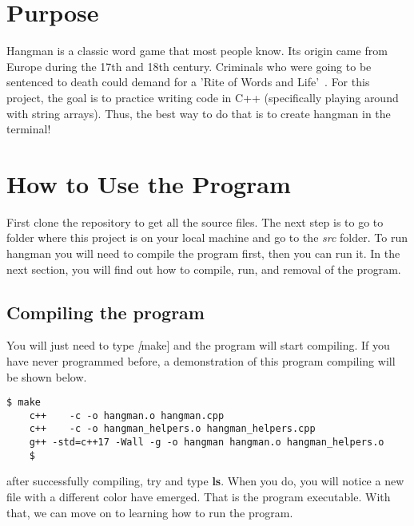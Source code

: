 \documentclass{article}
\title{\ASSIGNMENT}
\author{\NAME}
\date{\CLASS}
\begin{document}
\pagestyle{fancy}
\fancyfoot{}
\fancyhead{}
\fancyfoot[L]{\ASSIGNMENT\ -- \CLASS\ -- \NAME}
\fancyfoot[R]{\thepage}

\maketitle


\section{Purpose}

Hangman is a classic word game that most people know. Its origin came from Europe during the 17th and 18th century. Criminals who were going to be sentenced to death could demand for a 'Rite of Words and Life'~\cite{CitekeyMisc}. For this project, the goal is to practice writing code in C++ (specifically playing around with string arrays). Thus, the best way to do that is to create hangman in the terminal! 

\section{How to Use the Program}

First clone the repository to get all the source files. The next step is to go to folder where this project is on your local machine and go to the \textit{src} folder. To run hangman you will need to compile the program first, then you can run it. In the next section, you will find out how to compile, run, and removal of the program.

\subsection{Compiling the program}

You will just need to type \textit[make] and the program will start compiling. If you have never programmed before, a demonstration of this program compiling will be shown below.

\begin{Verbatim}[frame=single]
    $ make
    c++    -c -o hangman.o hangman.cpp
    c++    -c -o hangman_helpers.o hangman_helpers.cpp
    g++ -std=c++17 -Wall -g -o hangman hangman.o hangman_helpers.o
    $
\end{Verbatim}

after successfully compiling, try and type \textbf{ls}. When you do, you will notice a new file with a different color have emerged. That is the program executable. With that, we can move on to learning how to run the program.
\end{document}

